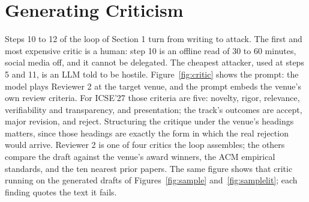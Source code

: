 \section{Generating Criticism}
\label{sec:critic}

Steps 10 to 12 of the loop of Section 1 turn from writing to
attack.
The first and most expensive critic is a human: step 10 is an
offline read of 30 to 60 minutes, social media off, and it
cannot be delegated.
The cheapest attacker, used at steps 5 and 11, is an LLM told to
be hostile.
Figure~\ref{fig:critic} shows the prompt: the model plays
Reviewer 2 at the target venue, and the prompt embeds the
venue's own review criteria.
For ICSE'27 those criteria are five: novelty, rigor, relevance,
verifiability and transparency, and presentation; the track's
outcomes are accept, major revision, and reject.
Structuring the critique under the venue's headings matters,
since those headings are exactly the form in which the real
rejection would arrive.
Reviewer 2 is one of four critics the loop assembles; the others
compare the draft against the venue's award winners, the ACM
empirical standards, and the ten nearest prior papers.
The same figure shows that critic running on the generated
drafts of Figures~\ref{fig:sample} and~\ref{fig:samplelit};
each finding quotes the text it fails.

